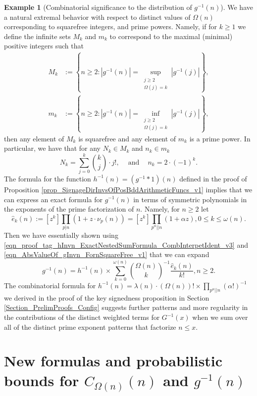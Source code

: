 \documentclass[11pt,reqno,a4letter]{article}
\numberwithin{figure}{section}
\numberwithin{table}{section}
\theoremstyle{plain}
\numberwithin{theorem}{section}
\theoremstyle{definition}
\newtheorem{example}[theorem]{Example}
\begin{document}
\begin{example}[Combinatorial significance to the distribution of $g^{-1}(n)$] 
We have a natural extremal behavior with respect to distinct values of $\Omega(n)$ 
corresponding to squarefree integers, and prime powers. Namely, if for $k \geq 1$ we define the 
infinite sets $M_k$ and $m_k$ to correspond to the maximal (minimal) positive integers such that 
\begin{align*} 
M_k & := \left\{n \geq 2: |g^{-1}(n)| = \underset{{\substack{j \geq 2 \\ \Omega(j) = k}}}{\operatorname{sup}} 
     |g^{-1}(j)|\right\}, \\  
m_k & := \left\{n \geq 2: |g^{-1}(n)| = \underset{{\substack{j \geq 2 \\ \Omega(j) = k}}}{\operatorname{inf}} 
     |g^{-1}(j)|\right\}, 
\end{align*} 
then any element of $M_k$ is squarefree and any element of $m_k$ is a prime power. 
In particular, we have that for any $N_k \in M_k$ and $n_k \in m_k$
\[
N_k = \sum_{j=0}^{k} \binom{k}{j} \cdot j!, \quad \mathrm{\ and\ } \quad n_k = 2 \cdot (-1)^{k}. 
\]
The formula for the function $h^{-1}(n) = (g^{-1} \ast 1)(n)$ defined in the proof of 
Proposition \ref{prop_SignageDirInvsOfPosBddArithmeticFuncs_v1} implies that we can express 
an exact formula for $g^{-1}(n)$ in terms of symmetric polynomials in the 
exponents of the prime factorization of $n$. 
Namely, for $n \geq 2$ let 
\[
\widehat{e}_k(n) := [z^k] \prod_{p|n} (1 + z \cdot \nu_p(n)) = [z^k] \prod_{p^{\alpha} || n} (1 + \alpha z), 
     0 \leq k \leq \omega(n). 
\]
Then we have essentially shown using 
\eqref{eqn_proof_tag_hInvn_ExactNestedSumFormula_CombInterpetIdent_v3} and 
\eqref{eqn_AbsValueOf_gInvn_FornSquareFree_v1} that we can expand 
\[
g^{-1}(n) = h^{-1}(n) \times \sum_{k=0}^{\omega(n)} \binom{\Omega(n)}{k}^{-1} 
     \frac{\widehat{e}_k(n)}{k!}, n \geq 2. 
\]
The combinatorial formula for 
$h^{-1}(n) = \lambda(n) \cdot (\Omega(n))! \times \prod_{p^{\alpha} || n} (\alpha !)^{-1}$ 
we derived in the proof of the key signedness proposition in 
Section \ref{Section_PrelimProofs_Config} 
suggests further patterns and more regularity in the contributions of the distinct weighted 
terms for $G^{-1}(x)$ when we sum over all of the distinct prime exponent patterns that factorize 
$n \leq x$. 
\end{example} 

\newpage
\section{New formulas and probabilistic bounds for $C_{\Omega(n)}(n)$ and $g^{-1}(n)$} 
\label{Section_NewFormulasForgInvn} 
\end{document}
